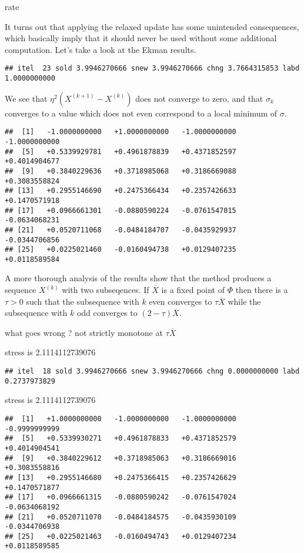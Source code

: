 \documentclass[
  12pt,
]{article}
\begin{document}
rate

It turns out that applying the relaxed update
has some unintended consequences, which basically imply that it should never
be used without some additional computation. Let's take a look at the
Ekman results.

\begin{verbatim}
## itel  23 sold 3.9946270666 snew 3.9946270666 chng 3.7664315853 labd 1.0000000000
\end{verbatim}

We see that \(\eta^2(X^{(k+1)}-X^{(k)})\) does not converge to zero, and that
\(\sigma_k\) converges to a value which does not even correspond to a local minimum
of \(\sigma\).

\begin{verbatim}
##  [1]   -1.0000000000   +1.0000000000   -1.0000000000   -1.0000000000
##  [5]   +0.5339929781   +0.4961878839   +0.4371852597   +0.4014904677
##  [9]   +0.3840229636   +0.3718985068   +0.3186669088   +0.3083558824
## [13]   +0.2955146690   +0.2475366434   +0.2357426633   +0.1470571918
## [17]   +0.0966661301   -0.0880590224   -0.0761547015   -0.0634068231
## [21]   +0.0520711068   -0.0484184707   -0.0435929937   -0.0344706856
## [25]   +0.0225021460   -0.0160494738   +0.0129407235   +0.0118589584
\end{verbatim}

A more thorough analysis of the results show that the method produces a sequence
\(X^{(k)}\) with two subseqences. If \(\overline{X}\) is a fixed point of
\(\Phi\) then there is a \(\tau>0\) such that
the subsequence with \(k\) even converges to \(\tau\overline{X}\)
while the subsequence with \(k\) odd converges to \((2-\tau)\overline{X}\).

what goes wrong ? not strictly monotone at \(\tau\overline{X}\)

stress is 2.1114112739076

\begin{verbatim}
## itel  18 sold 3.9946270666 snew 3.9946270666 chng 0.0000000000 labd 0.2737973829
\end{verbatim}

stress is 2.1114112739076

\begin{verbatim}
##  [1]   +1.0000000000   -1.0000000000   -1.0000000000   -0.9999999999
##  [5]   +0.5339930271   +0.4961878833   +0.4371852579   +0.4014904541
##  [9]   +0.3840229612   +0.3718985063   +0.3186669016   +0.3083558816
## [13]   +0.2955146680   +0.2475366415   +0.2357426629   +0.1470571877
## [17]   +0.0966661315   -0.0880590242   -0.0761547024   -0.0634068192
## [21]   +0.0520711070   -0.0484184575   -0.0435930109   -0.0344706938
## [25]   +0.0225021463   -0.0160494743   +0.0129407234   +0.0118589585
\end{verbatim}
\end{document}
